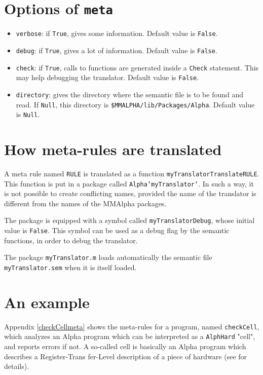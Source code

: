 \documentclass[12pt]{article}
\begin{document}
\section{Options of \texttt{meta}}
\label{options}
\begin{itemize}
\item \texttt{verbose}: if \texttt{True}, gives some information. Default value is 
\texttt{False}.
\item \texttt{debug}: if \texttt{True}, gives a lot of information. Default value is 
\texttt{False}.
\item \texttt{check}: if \texttt{True}, calls to functions are generated inside
a \texttt{Check} statement. This may help debugging the translator. Default value is 
\texttt{False}.
\item \texttt{directory}: gives the directory where the semantic file is to be
found and read. If \texttt{Null}, this directory is \texttt{\$MMALPHA/lib/Packages/Alpha}.
Default value is \texttt{Null}. 
\end{itemize}

\section{How meta-rules are translated}
\label{translation}
A meta rule named 
\texttt{RULE} is translated as a function 
\texttt{myTranslatorTranslateRULE}.
 This function is put in a package called 
\texttt{Alpha`myTranslator`}.
 In such a way, it is not possible to create conflicting names, provided
 the name of the translator is different from the names of the MMAlpha packages.

The package is equipped with a symbol called 
\texttt{myTranslatorDebug}, whose initial value is 
\texttt{False}.
 This symbol can be used as a debug flag by the semantic functions, in order
 to debug the translator.

The package 
\texttt{myTranslator.m} loads automatically the semantic file 
\texttt{myTranslator.sem} when it is itself loaded.

\section{An example}
\label{example}
Appendix \ref{checkCellmeta}
 shows the meta-rules for a program, named 
\texttt{checkCell}, which analyzes an Alpha 
program which can be interpreted as a 
\texttt{AlphHard} 
"cell", and reports errors if not.
A so-called cell is basically an Alpha program which describes a Register-Trans
fer-Level description of a piece of hardware (see
\cite{patricia}
 for details).
\end{document}
